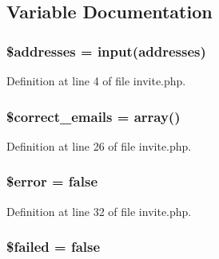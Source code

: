 \subsection{Variable Documentation}
\subsubsection[{\texorpdfstring{\$addresses}{$addresses}}]{\setlength{\rightskip}{0pt plus 5cm}\$addresses = {\bf input}(\textquotesingle{}addresses\textquotesingle{})}\hypertarget{actions_2invite_8php_a9fbeb6aeca916af4f45de53880787ef9}{}\label{actions_2invite_8php_a9fbeb6aeca916af4f45de53880787ef9}


Definition at line 4 of file invite.\+php.

\subsubsection[{\texorpdfstring{\$correct\+\_\+emails}{$correct_emails}}]{\setlength{\rightskip}{0pt plus 5cm}\$correct\+\_\+emails = array()}\hypertarget{actions_2invite_8php_ad50fdb62ae2a9888161a9d8da46b7ee7}{}\label{actions_2invite_8php_ad50fdb62ae2a9888161a9d8da46b7ee7}


Definition at line 26 of file invite.\+php.

\subsubsection[{\texorpdfstring{\$error}{$error}}]{\setlength{\rightskip}{0pt plus 5cm}\$error = false}\hypertarget{actions_2invite_8php_aeba2ab722cedda53dbb7ec1a59f45550}{}\label{actions_2invite_8php_aeba2ab722cedda53dbb7ec1a59f45550}


Definition at line 32 of file invite.\+php.

\subsubsection[{\texorpdfstring{\$failed}{$failed}}]{\setlength{\rightskip}{0pt plus 5cm}\$failed = false}\hypertarget{actions_2invite_8php_a145d4f1dd5e06d4d3d49ebc01751747a}{}\label{actions_2invite_8php_a145d4f1dd5e06d4d3d49ebc01751747a}


